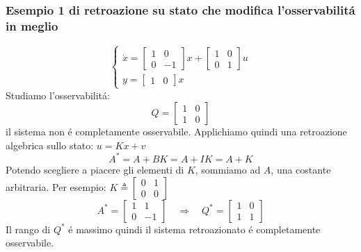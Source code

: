 \documentclass[../main.tex]{subfiles}
\begin{document}
	\subsubsection{Esempio 1 di retroazione su stato che modifica l'osservabilit\'a in meglio}
		\[
			\begin{cases}
				\dot x =
				\begin{bmatrix}
					1 & 0\\
					0 & -1
				\end{bmatrix} x+
				\begin{bmatrix}
					1 & 0\\
					0 & 1
				\end{bmatrix} u
				\\
				y = 
				\begin{bmatrix}
					1 & 0
				\end{bmatrix} x
			\end{cases}
		\]
		Studiamo l'osservabilit\'a:
		\[
			Q = 
			\begin{bmatrix}
				1 & 0\\
				1 & 0
			\end{bmatrix}
		\]
		il sistema non \'e completamente osservabile. Applichiamo quindi una retroazione algebrica sullo stato: $ u = Kx + v $
		\[
			A^{*} = A+BK = A+IK = A + K
		\]
		Potendo scegliere a piacere gli elementi di $ K $, sommiamo ad $ A $, una costante arbitraria. Per esempio: $ K \triangleq \left[ \begin{smallmatrix} 0 & 1\\ 0 & 0 \end{smallmatrix} \right] $
		\[
			A^{*} = 
			\begin{bmatrix}
				1 & 1\\
				0 & -1
			\end{bmatrix}
			\quad\Rightarrow\quad
			Q^{*} =
			\begin{bmatrix}
				1 & 0\\
				1 & 1
			\end{bmatrix}
		\]
		Il rango di $ Q^{*} $ \'e massimo quindi il sistema retroazionato \'e completamente osservabile.
		
\end{document}
